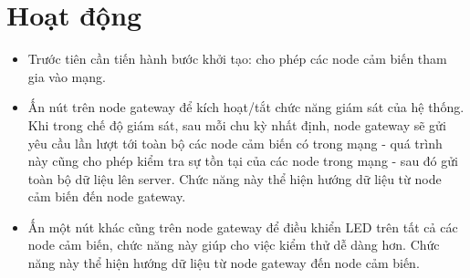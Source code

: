     \section{Hoạt động}
        \begin{itemize}
            \item Trước tiên cần tiến hành bước khởi tạo: cho phép các node cảm biến tham gia vào mạng.
            \item Ấn nút trên node gateway để kích hoạt/tắt chức năng giám sát của hệ thống. Khi trong chế độ giám sát, sau mỗi chu kỳ nhất định, node gateway sẽ gửi yêu cầu lần lượt tới toàn bộ các node cảm biến có trong mạng - quá trình này cũng cho phép kiểm tra sự tồn tại của các node trong mạng - sau đó gửi toàn bộ dữ liệu lên server. Chức năng này thể hiện hướng dữ liệu từ node cảm biến đến node gateway.
            \item Ấn một nút khác cũng trên node gateway để điều khiển LED trên tất cả các node cảm biến, chức năng này giúp cho việc kiểm thử dễ dàng hơn. Chức năng này thể hiện hướng dữ liệu từ node gateway đến node cảm biến.
        \end{itemize}

